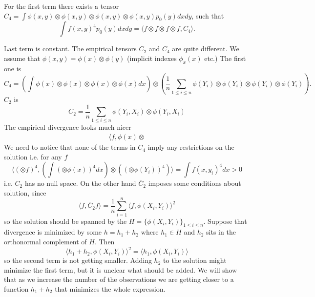 \documentclass[10pt]{article}
\begin{document}
For the first term there exists a tensor $C_4 = \int \phi(x,y) \otimes \phi(x,y) \otimes \phi(x,y) \otimes \phi(x,y) p_0(y) dx dy$, such that 
\begin{equation}
 \int f(x,y)^4 p_0(y) dx dy = \langle f \otimes f \otimes f \otimes f , C_4 \rangle.
\end{equation}

Last term is constant. The empirical tensors $C_2$ and $C_4$ are quite different. We assume that $\phi(x,y) = \phi(x) \otimes \phi(y)$ (implicit indexes $ \phi_x(x)$ etc.) The first one is 
\begin{equation}
 C_4 = \left( \int \phi(x) \otimes \phi(x) \otimes \phi(x) \otimes \phi(x) dx  \right)  \otimes \left( \frac 1 n\sum_{1 \leq i \leq n}  \phi(Y_{i}) \otimes \phi(Y_{i}) \otimes \phi(Y_{i}) \otimes \phi(Y_{i}) \right). 
\end{equation}
$C_2$ is
\begin{equation}
 C_2 = \frac 1 n \sum_{1 \leq i \leq n } \phi(Y_{i},X_{i}) \otimes \phi(Y_{i},X_{i}) 
\end{equation}
The empirical divergence looks much nicer
\begin{align}
 \langle f, \phi(x) \otimes
\end{align}
We need to notice that none of the terms in $C_4$ imply any restrictions on the solution i.e. for any $f$  
\begin{equation}
 \langle  (\otimes f)^4  ,  \left( \int  (\otimes \phi(x))^4 dx  \right)  \otimes \left(    (\otimes \phi(Y_{i}))^4 \right) \rangle = \int f(x,y_i)^4 dx > 0
\end{equation}
i.e. $C_2$ has no null space. On the other hand $\bar C_2$ imposes some conditions about solution, since 
\begin{equation}
 \langle f, \bar C_2 f \rangle = \frac 1 n \sum_{i=1}^n \langle f , \phi(X_i,Y_i) \rangle^2   
\end{equation}
so the solution should be spanned by the $H = \{ \phi(X_i,Y_i) \}_{1 \leq i \leq n}$. Suppose that divergence is minimized by some $h = h_1 + h_2$ where $h_1 \in H$ and $h_2$ sits in the orthonormal complement of $H$. Then 
\begin{equation}
 \langle h_1 + h_2 , \phi(X_i,Y_i) \rangle^2 =\langle h_1 , \phi(X_i,Y_i) \rangle
\end{equation}
so the second term is not getting smaller. Adding $h_2$ to the solution might minimize the first term, but it is unclear what should be added. We will show that as we increase the number of the observations we are getting closer to a function $h_1 + h_2$ that minimizes the whole expression.
\end{document}
